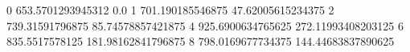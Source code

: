 0 653.5701293945312 0.0
1 701.190185546875 47.62005615234375
2 739.31591796875 85.74578857421875
4 925.6900634765625 272.11993408203125
6 835.5517578125 181.98162841796875
8 798.0169677734375 144.44683837890625
